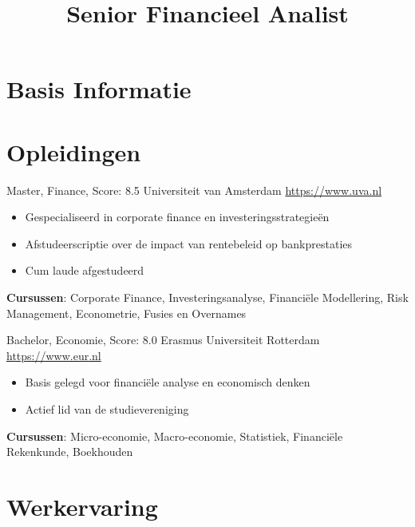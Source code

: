 \documentclass[a4paper, serif, 10pt]{moderncv}
\title{Senior Financieel Analist}
\begin{document}
\maketitle

\section{Basis Informatie}

\section{Opleidingen}

        {Master, Finance, Score: 8.5}
        {Universiteit van Amsterdam}
        {\url{https://www.uva.nl}}
        {}
        {\begin{itemize}
\item Gespecialiseerd in corporate finance en investeringsstrategieën
\item Afstudeerscriptie over de impact van rentebeleid op bankprestaties
\item Cum laude afgestudeerd
\end{itemize}
\textbf{Cursussen}: Corporate Finance, Investeringsanalyse, Financiële Modellering, Risk Management, Econometrie, Fusies en Overnames}

        {Bachelor, Economie, Score: 8.0}
        {Erasmus Universiteit Rotterdam}
        {\url{https://www.eur.nl}}
        {}
        {\begin{itemize}
\item Basis gelegd voor financiële analyse en economisch denken
\item Actief lid van de studievereniging
\end{itemize}
\textbf{Cursussen}: Micro-economie, Macro-economie, Statistiek, Financiële Rekenkunde, Boekhouden}
\section{Werkervaring}
\end{document}

